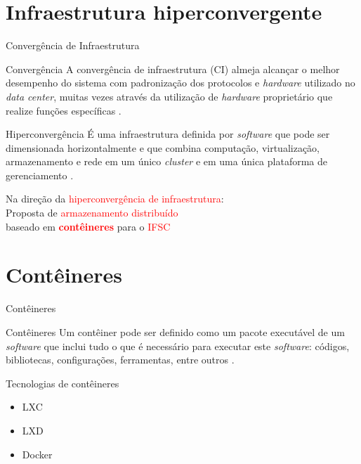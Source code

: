 \documentclass{beamer}
\begin{document}

\section{Infraestrutura hiperconvergente}

\begin{frame}{Convergência de Infraestrutura}
    \begin{block}{Convergência}
        A convergência de infraestrutura (CI) almeja alcançar o melhor desempenho do sistema com padronização dos protocolos e \textit{hardware} utilizado no \textit{data center}, muitas vezes através da utilização de \textit{hardware} proprietário que realize funções específicas \cite{netappconvergence}.
    \end{block}
    
     \begin{block}{Hiperconvergência}
        É uma infraestrutura definida por \textit{software} que pode ser dimensionada horizontalmente \cite{vmwarehyperconvergence} e que combina computação, virtualização, armazenamento e rede em um único \textit{cluster} e em uma única plataforma de gerenciamento \cite{ciscohyperconvergence}.
    \end{block}   
\end{frame}


\begin{frame}
    \centering
    \Large{Na direção da \textcolor{red}{hiperconvergência de infraestrutura}:
    \\Proposta de \textcolor{red}{armazenamento distribuído}
    \\baseado em \textbf{\textcolor{red}{contêineres}} para o \textcolor{red}{IFSC}}
    \break
\end{frame}


\section{Contêineres}

\begin{frame}{Contêineres}
    \begin{block}{Contêineres}
        Um contêiner pode ser definido como um pacote executável de um \textit{software} que inclui tudo o que é necessário para executar este \textit{software}: códigos, bibliotecas, configurações, ferramentas, entre outros \cite{aboutcontainer}.
    \end{block}
    
    \begin{block}{Tecnologias de contêineres}
    \begin{itemize}
        \item LXC
        \item LXD
        \item Docker
    \end{itemize}
    \end{block}
\end{frame}
\end{document}
